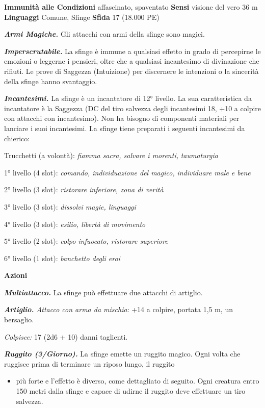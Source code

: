 \begin{multicols}{2}
\textbf{Immunità alle Condizioni} affascinato, spaventato \textbf{Sensi}
visione del vero 36 m \textbf{Linguaggi} Comune,
Sfinge \textbf{Sfida} 17 (18.000 PE)

\emph{\textbf{Armi Magiche.}} Gli attacchi con armi della sfinge sono
magici.

\emph{\textbf{Imperscrutabile.}} La sfinge è immune a qualsiasi effetto
in grado di percepirne le emozioni o leggerne i pensieri, oltre che a
qualsiasi incantesimo di divinazione che rifiuti. Le prove di Saggezza
(Intuizione) per discernere le intenzioni o la sincerità della sfinge
hanno svantaggio.

\emph{\textbf{Incantesimi.}} La sfinge è un incantatore di 12° livello.
La sua caratteristica da incantatore è la Saggezza (DC del tiro salvezza
degli incantesimi 18, +10 a colpire con attacchi con incantesimo). Non
ha bisogno di componenti materiali per lanciare i suoi incantesimi. La
sfinge tiene preparati i seguenti incantesimi da chierico:

Trucchetti (a volontà): \emph{fiamma sacra, salvare i morenti,}
\emph{taumaturgia}

1° livello (4 slot): \emph{comando, individuazione del magico,}
\emph{individuare male e bene}

2° livello (3 slot): \emph{ristorare inferiore, zona di verità}

3° livello (3 slot): \emph{dissolvi magie, linguaggi}

4° livello (3 slot): \emph{esilio, libertà di movimento}

5° livello (2 slot): \emph{colpo infuocato, ristorare superiore}

6° livello (1 slot): \emph{banchetto degli eroi}


\textbf{Azioni}

\emph{\textbf{Multiattacco.}} La sfinge può effettuare due attacchi di
artiglio.

\emph{\textbf{Artiglio.} Attacco con arma da mischia}: +14 a colpire,
portata 1,5 m, un bersaglio.

\emph{Colpisce:} 17 (2d6 + 10) danni taglienti.

\emph{\textbf{Ruggito (3/Giorno).}} La sfinge emette un ruggito magico.
Ogni volta che ruggisce prima di terminare un riposo lungo, il ruggito


\begin{itemize}
\item
  più forte e l'effetto è diverso, come dettagliato di seguito. Ogni
  creatura entro 150 metri dalla sfinge e capace di udirne il ruggito
  deve effettuare un tiro salvezza.
\end{itemize}



\end{multicols}
